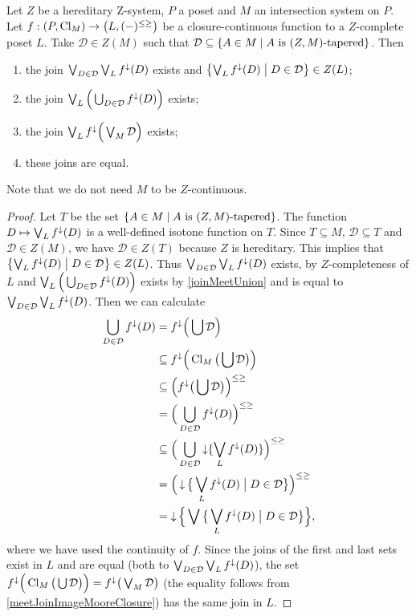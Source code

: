 \begin{proposition} \label{extensionMcontinuousFunctionZcontinuous}
Let $Z$ be a hereditary $\mathrm{Z}$-system, $P$ a poset and $M$ an intersection system on $P$. Let $f: \sSet{P, \Closure_M}\to \sSet{L, (-)^{\leq\geq}}$ be a closure-continuous function to a $Z$-complete poset $L$. Take $\mathcal{D} \in Z(M)$ such that $\mathcal{D} \subseteq \setbuilder{A\in M}{\text{$A$ is $(Z,M)$-tapered}}$. Then 
\begin{enumerate}
\item the join $\bigvee_{D\in \mathcal{D}}\bigvee_L f^\downarrow(D)$ exists and $\setbuilder{\bigvee_L f^\imf(D)}{D\in \mathcal{D}} \in Z(L)$;
\item the join $\bigvee_L \Big(\bigcup_{D\in \mathcal{D}}f^\downarrow(D)\Big)$ exists;
\item the join $\bigvee_L f^\downarrow\Big(\bigvee_{M}\mathcal{D}\Big)$ exists;
\item these joins are equal.
\end{enumerate}
\end{proposition}
Note that we do not need $M$ to be $Z$-continuous.
\begin{proof}
Let $T$ be the set $\setbuilder{A\in M}{\text{$A$ is $(Z,M)$-tapered}}$. The function $D\mapsto \bigvee_L f^\downarrow(D)$ is a well-defined isotone function on $T$. Since $T\subseteq M$, $\mathcal{D} \subseteq T$ and $\mathcal{D}\in Z(M)$, we have $\mathcal{D} \in Z(T)$ because $Z$ is hereditary. This implies that $\setbuilder{\bigvee_L f^\imf(D)}{D\in \mathcal{D}} \in Z(L)$. Thus $\bigvee_{D\in \mathcal{D}}\bigvee_L f^\downarrow(D)$ exists, by $Z$-completeness of $L$ and $\bigvee_L \Big(\bigcup_{D\in \mathcal{D}}f^\downarrow(D)\Big)$ exists by \ref{joinMeetUnion} and is equal to $\bigvee_{D\in \mathcal{D}}\bigvee_L f^\downarrow(D)$.
Then we can calculate
\begin{align*}
\bigcup_{D\in \mathcal{D}}f^\imf(D) &= f^\imf\Big(\bigcup \mathcal{D}\Big) \\
&\subseteq f^\imf\Big(\Closure_{M}\big(\bigcup \mathcal{D}\big)\Big) \\
&\subseteq \Big(f^\imf\big(\bigcup \mathcal{D}\big)\Big)^{\leq\geq} \\
&= \Big(\bigcup_{D\in \mathcal{D}}f^\imf(D) \Big)^{\leq\geq} \\
&\subseteq \Big(\bigcup_{D\in \mathcal{D}}\downset\{\bigvee_L f^\imf(D)\} \Big)^{\leq\geq} \\
&= \Big(\downset \setbuilder[\big]{\bigvee_L f^\imf(D)}{D\in \mathcal{D}} \Big)^{\leq\geq} \\
&= \downset \Big\{\bigvee \setbuilder[\big]{\bigvee_L f^\imf(D)}{D\in \mathcal{D}} \Big\},
\end{align*}
where we have used the continuity of $f$. Since the joins of the first and last sets exist in $L$ and are equal (both to $\bigvee_{D\in \mathcal{D}}\bigvee_L f^\downarrow(D)$), the set $f^\downarrow\Big(\operatorname{Cl}_{M}\big(\bigcup \mathcal{D}\big)\Big) = f^\downarrow\big(\bigvee_{M}\mathcal{D}\big)$ (the equality follows from \ref{meetJoinImageMooreClosure}) has the same join in $L$.
\end{proof}
